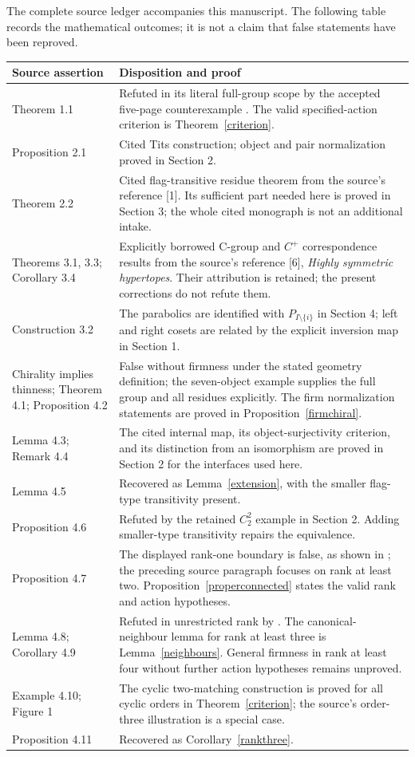 \documentclass[11pt]{article}
\begin{document}
The complete source ledger accompanies this manuscript. The
following table records the mathematical outcomes; it is not
a claim that false statements have been reproved.
\begin{longtable}{p{.23\linewidth}p{.70\linewidth}}
\textbf{Source assertion}&\textbf{Disposition and proof}\\\hline
Theorem 1.1 & Refuted in its literal full-group scope by the
accepted five-page counterexample \cite{CE}. The valid specified-action
criterion is Theorem~\ref{criterion}.\\[3pt]
Proposition 2.1 & Cited Tits construction; object and pair
normalization proved in Section 2.\\[3pt]
Theorem 2.2 & Cited flag-transitive residue theorem from the
source's reference [1]. Its sufficient part needed here is proved
in Section 3; the whole cited monograph is not an additional intake.\\[3pt]
Theorems 3.1, 3.3;
Corollary 3.4 & Explicitly borrowed C-group and $C^+$ correspondence
results from the source's reference [6], \emph{Highly symmetric
hypertopes}. Their attribution is retained; the present corrections
do not refute them.\\[3pt]
Construction 3.2 & The parabolics are identified with
$P_{I\setminus\{i\}}$ in Section 4; left and right cosets are related
by the explicit inversion map in Section 1.\\[3pt]
Chirality implies thinness;
Theorem 4.1;
Proposition 4.2 & False without firmness under the stated geometry
definition; the seven-object example \cite{CF} supplies the full
group and all residues explicitly. The firm normalization statements
are proved in Proposition~\ref{firmchiral}.\\[3pt]
Lemma 4.3;
Remark 4.4 & The cited internal map, its object-surjectivity criterion,
and its distinction from an isomorphism are proved in Section 2 for
the interfaces used here.\\[3pt]
Lemma 4.5 & Recovered as Lemma~\ref{extension}, with the smaller
flag-type transitivity present.\\[3pt]
Proposition 4.6 & Refuted by the retained $C_2^2$ example in Section 2.
Adding smaller-type transitivity repairs the equivalence.\\[3pt]
Proposition 4.7 & The displayed rank-one boundary is false, as shown
in \cite{CF}; the preceding source paragraph focuses on rank at
least two. Proposition~\ref{properconnected} states the valid
rank and action hypotheses.\\[3pt]
Lemma 4.8;
Corollary 4.9 & Refuted in unrestricted rank by \cite{PB}. The
canonical-neighbour lemma for rank at least three is
Lemma~\ref{neighbours}. General firmness in rank at least four
without further action hypotheses remains unproved.\\[3pt]
Example 4.10;
Figure 1 & The cyclic two-matching construction is proved for all
cyclic orders in Theorem~\ref{criterion}; the source's order-three
illustration is a special case.\\[3pt]
Proposition 4.11 & Recovered as Corollary~\ref{rankthree}.\\
\end{longtable}
\end{document}
